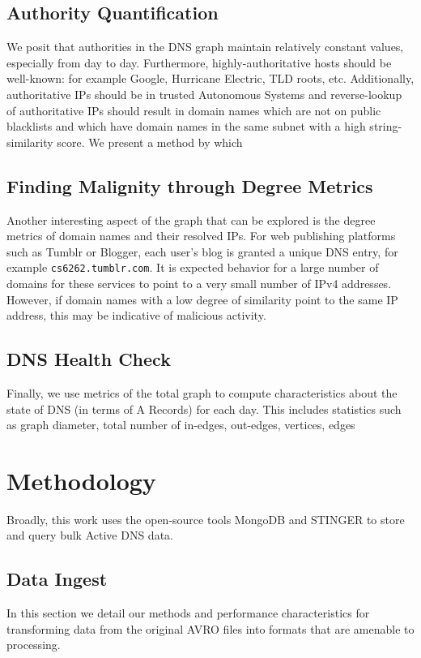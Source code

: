 \documentclass{acm_proc_article-sp}
\begin{document}
\subsection{Authority Quantification}
We posit that authorities in the DNS graph maintain relatively constant values, especially from day to day. Furthermore, highly-authoritative hosts should be well-known: for example Google, Hurricane Electric, TLD roots, etc. Additionally, authoritative IPs should be in trusted Autonomous Systems and reverse-lookup of authoritative IPs should result in domain names which are not on public blacklists and which have domain names in the same subnet with a high string-similarity score. We present a method by which 

\subsection{Finding Malignity through Degree Metrics}
Another interesting aspect of the graph that can be explored is the degree metrics of domain names and their resolved IPs. For web publishing platforms such as Tumblr or Blogger, each user's blog is granted a unique DNS entry, for example \texttt{cs6262.tumblr.com}. It is expected behavior for a large number of domains for these services to point to a very small number of IPv4 addresses. However, if domain names with a low degree of similarity point to the same IP address, this may be indicative of malicious activity.

\subsection{DNS Health Check}
Finally, we use metrics of the total graph to compute characteristics about the state of DNS (in terms of A Records) for each day. This includes statistics such as graph diameter, total number of in-edges, out-edges, vertices, edges

\section{Methodology}
Broadly, this work uses the open-source tools MongoDB and STINGER to store and query bulk Active DNS data. 

\subsection{Data Ingest}
In this section we detail our methods and performance characteristics for transforming data from the original AVRO files into formats that are amenable to processing.
\end{document}
